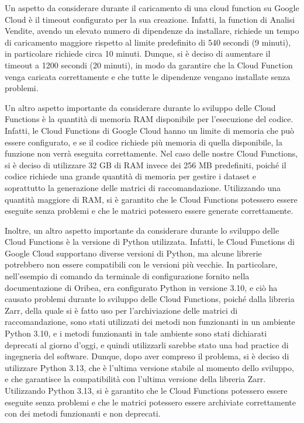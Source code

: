 Un aspetto da considerare durante il caricamento di una cloud function su Google Cloud è il timeout configurato per la sua creazione. Infatti, la function di Analisi Vendite, avendo un elevato numero di dipendenze da installare, richiede un tempo di caricamento maggiore rispetto al limite predefinito di 540 secondi (9 minuti), in particolare richiede circa 10 minuti. Dunque, si è deciso di aumentare il timeout a 1200 secondi (20 minuti), in modo da garantire che la Cloud Function venga caricata correttamente e che tutte le dipendenze vengano installate senza problemi.

Un altro aspetto importante da considerare durante lo sviluppo delle Cloud Functions è la quantità di memoria RAM disponibile per l'esecuzione del codice. Infatti, le Cloud Functions di Google Cloud hanno un limite di memoria che può essere configurato, e se il codice richiede più memoria di quella disponibile, la funzione non verrà eseguita correttamente. Nel caso delle nostre Cloud Functions, si è deciso di utilizzare 32 GB di RAM invece dei 256 MB predefiniti, poiché il codice richiede una grande quantità di memoria per gestire i dataset e soprattutto la generazione delle matrici di raccomandazione. Utilizzando una quantità maggiore di RAM, si è garantito che le Cloud Functions potessero essere eseguite senza problemi e che le matrici potessero essere generate correttamente.

Inoltre, un altro aspetto importante da considerare durante lo sviluppo delle Cloud Functions è la versione di Python utilizzata. Infatti, le Cloud Functions di Google Cloud supportano diverse versioni di Python, ma alcune librerie potrebbero non essere compatibili con le versioni più vecchie. In particolare, nell'esempio di comando da terminale di configurazione fornito nella documentazione di Oribea, era configurato Python in versione 3.10, e ciò ha causato problemi durante lo sviluppo delle Cloud Functions, poiché dalla libreria Zarr, della quale si è fatto uso per l'archiviazione delle matrici di raccomandazione, sono stati utilizzati dei metodi non funzionanti in un ambiente Python 3.10, e i metodi funzionanti in tale ambiente sono stati dichiarati deprecati al giorno d'oggi, e quindi utilizzarli sarebbe stato una bad practice di ingegneria del software. Dunque, dopo aver compreso il problema, si è deciso di utilizzare Python 3.13, che è l'ultima versione stabile al momento dello sviluppo, e che garantisce la compatibilità con l'ultima versione della libreria Zarr. Utilizzando Python 3.13, si è garantito che le Cloud Functions potessero essere eseguite senza problemi e che le matrici potessero essere archiviate correttamente con dei metodi funzionanti e non deprecati.

